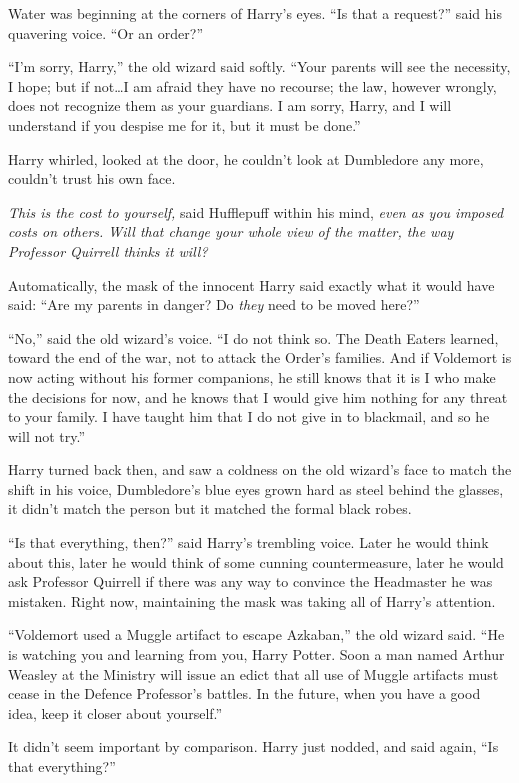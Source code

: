 Water was beginning at the corners of Harry’s eyes. “Is that a request?” said his quavering voice. “Or an order?”

“I’m sorry, Harry,” the old wizard said softly. “Your parents will see the necessity, I hope; but if not…I am afraid they have no recourse; the law, however wrongly, does not recognize them as your guardians. I am sorry, Harry, and I will understand if you despise me for it, but it must be done.”

Harry whirled, looked at the door, he couldn’t look at Dumbledore any more, couldn’t trust his own face.

\emph{This is the cost to yourself,} said Hufflepuff within his mind, \emph{even as you imposed costs on others. Will that change your whole view of the matter, the way Professor Quirrell thinks it will?}

Automatically, the mask of the innocent Harry said exactly what it would have said: “Are my parents in danger? Do \emph{they} need to be moved here?”

“No,” said the old wizard’s voice. “I do not think so. The Death Eaters learned, toward the end of the war, not to attack the Order’s families. And if Voldemort is now acting without his former companions, he still knows that it is I who make the decisions for now, and he knows that I would give him nothing for any threat to your family. I have taught him that I do not give in to blackmail, and so he will not try.”

Harry turned back then, and saw a coldness on the old wizard’s face to match the shift in his voice, Dumbledore’s blue eyes grown hard as steel behind the glasses, it didn’t match the person but it matched the formal black robes.

“Is that everything, then?” said Harry’s trembling voice. Later he would think about this, later he would think of some cunning countermeasure, later he would ask Professor Quirrell if there was any way to convince the Headmaster he was mistaken. Right now, maintaining the mask was taking all of Harry’s attention.

“Voldemort used a Muggle artifact to escape Azkaban,” the old wizard said. “He is watching you and learning from you, Harry Potter. Soon a man named Arthur Weasley at the Ministry will issue an edict that all use of Muggle artifacts must cease in the Defence Professor’s battles. In the future, when you have a good idea, keep it closer about yourself.”

It didn’t seem important by comparison. Harry just nodded, and said again, “Is that everything?”

